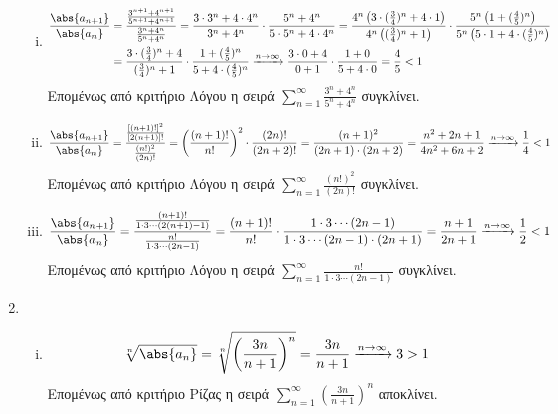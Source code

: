 \begin{enumerate}
\begin{enumerate}[i)]
      \item 
        \begin{align*}
          \frac{\abs{a_{n+1}}}{\abs{a_{n}}}
                &=\frac{\frac{3^{n+1}+4^{n+1}}{5^{n+1}
                +4^{n+1}}}{\frac{3^{n}+4^{n}}{5^{n}+4^{n}}} = 
                \frac{3 \cdot 3^{n}+ 4\cdot 4^{n}}{3^{n}+4^{n}} \cdot 
                \frac{5^{n}+4^{n}}{5\cdot 5^{n}+ 4 \cdot 4^{n}} = \frac{4^{n}
                  \left(3\cdot (\frac{3}{4})^{n}+4 
                \cdot 1\right)}{4^{n}\left((\frac{3}{4} )^{n}+ 1\right)} \cdot 
                \frac{5^{n}\left(1+ (\frac{4}{5})^{n}\right)}{5^{n}\left(5\cdot 1 + 4
                \cdot(\frac{4}{5} )^{n}\right)} \\ 
                &= \frac{3\cdot (\frac{3}{4})^{n}+4}{(\frac{3}{4} )^{n}+ 1} \cdot 
                \frac{1+ (\frac{4}{5})^{n}}{5 + 4 \cdot(\frac{4}{5} )^{n}} 
                \xrightarrow{n \to \infty} \frac{3 \cdot 0 + 4}{0 + 1 } \cdot 
                \frac{1 + 0}{5 + 4 \cdot 0} = \frac{4}{5} <1
        \end{align*} 
        Επομένως από κριτήριο Λόγου η σειρά $ \sum_{n=1}^{\infty}
        \frac{3^{n}+4^{n}}{5^{n}+4^{n}} $ συγκλίνει.

      \item 
        \[
          \frac{\abs{a_{n+1}}}{\abs{a_{n}}} =
          \frac{\frac{[(n+1)!]^{2}}{[2(n+1)]!}}{\frac{(n!)^{2}}{(2n)!}} = 
          \left(\frac{(n+1)!}{n!}\right)^{2} \cdot \frac{(2n)!}{(2n+2)!} = 
          \frac{(n+1)^{2} }{(2n+1)\cdot (2n+2)} = 
          \frac{n^{2}+2n+1}{4n^{2}+6n+2} \xrightarrow{n \to \infty} 
          \frac{1}{4} <1
        \] 
        Επομένως από κριτήριο Λόγου η σειρά $ \sum_{n=1}^{\infty} \frac{(n!)^{2}}
        {(2n)!} $ συγκλίνει.

      \item 
        \[
          \frac{\abs{a_{n+1}}}{\abs{a_{n}}} = \frac{\frac{(n+1)!}{1\cdot 3 \cdots
          (2(n+1)-1)}}{\frac{n!}{1\cdot 3 \cdots (2n-1)}} = 
          \frac{(n+1)!}{n!} \cdot \frac{1\cdot 3 \cdots (2n-1)}{1\cdot 3 \cdots 
          (2n-1)\cdot (2n+1)} = \frac{n+1}{2n+1} \xrightarrow{n \to \infty} 
          \frac{1}{2} <1 
        \] 
        Επομένως από κριτήριο Λόγου η σειρά $ \sum_{n=1}^{\infty} 
        \frac{n!}{1\cdot 3 \cdots (2n-1)}  $ συγκλίνει.
    \end{enumerate}

  \item 
    \begin{enumerate}[i)]
      \item 
        \[
          \sqrt[n]{\abs{a_{n}}} = \sqrt[n]{\left(\frac{3n}{n+1} \right)^{n}} = 
          \frac{3n}{n+1}\xrightarrow{n \to \infty} 3 > 1 
        \]
        Επομένως από κριτήριο Ρίζας η σειρά $ \sum_{n=1}^{\infty} 
        \left(\frac{3n}{n+1}\right)^{n} $ αποκλίνει.


\end{enumerate}
\end{enumerate}
